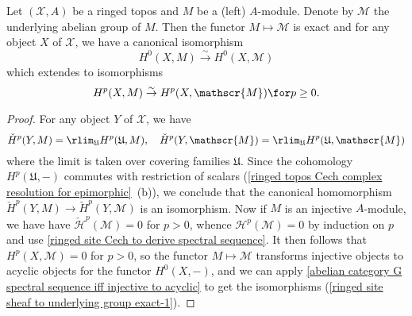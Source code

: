 \begin{corollary}\label{ringed site sheaf cohomology restriction of scalar}
Let $(\mathcal{X},A)$ be a ringed topos and $M$ be a (left) $A$-module. Denote by $\mathscr{M}$ the underlying abelian group of $M$. Then the functor $M\mapsto\mathscr{M}$ is exact and for any object $X$ of $\mathcal{X}$, we have a canonical isomorphism
\[H^0(X,M) \stackrel{\sim}{\to } H^0(X,\mathscr{M})\]
which extendes to isomorphisms
\begin{equation}\label{ringed site sheaf to underlying group exact-1}
H^p(X,M) \stackrel{\sim}{\to } H^p(X,\mathscr{M})\for p\geq 0.
\end{equation}
\end{corollary}
\begin{proof}
For any object $Y$ of $\mathcal{X}$, we have
\[\check{H}^p(Y,M)=\rlim_\mathfrak{U}H^p(\mathfrak{U},M),\quad \check{H}^p(Y,\mathscr{M})=\rlim_\mathfrak{U}H^p(\mathfrak{U},\mathscr{M})\]
where the limit is taken over covering families $\mathfrak{U}$. Since the cohomology $H^p(\mathfrak{U},-)$ commutes with restriction of scalars (\cref{ringed topos Cech complex resolution for epimorphic}~(b)), we conclude that the canonical homomorphism $\check{H}^p(Y,M)\to \check{H}^p(Y,\mathscr{M})$ is an isomorphism. Now if $M$ is an injective $A$-module, we have have $\check{\mathcal{H}}^p(\mathscr{M})=0$ for $p>0$, whence $\mathcal{H}^p(\mathscr{M})=0$ by induction on $p$ and use \cref{ringed site Cech to derive spectral sequence}. It then follows that $H^p(X,\mathscr{M})=0$ for $p>0$, so the functor $M\mapsto\mathscr{M}$ transforms injective objects to acyclic objects for the functor $H^0(X,-)$, and we can apply \cref{abelian category G spectral sequence iff injective to acyclic} to get the isomorphisms (\ref{ringed site sheaf to underlying group exact-1}).
\end{proof}


